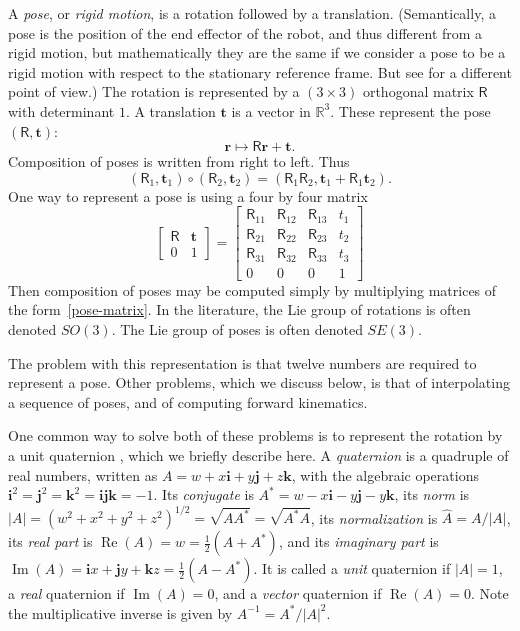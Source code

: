 \documentclass[reqno,12pt]{amsart}
\newcommand\bi{\bm i}
\newcommand\bj{\bm j}
\newcommand\bk{\bm k}
\DeclareMathOperator\realpart{Re}
\DeclareMathOperator\imagpart{Im}
\begin{document}
A \emph{pose}, or \emph{rigid motion}, is a rotation followed by a translation.  (Semantically, a pose is the position of the end effector of the robot, and thus different from a rigid motion, but mathematically they are the same if we consider a pose to be a rigid motion with respect to the stationary reference frame.  But see \cite{chirikjian-et-al} for a different point of view.)  The rotation is represented by a $(3 \times 3)$ orthogonal matrix $\mathsf R$ with determinant $1$.  A translation $\bm t$ is a vector in $\mathbb R^3$.  These represent the pose $(\mathsf R, \bm t)$:
\begin{equation}
\label{pose action}
\bm r \mapsto \mathsf R \bm r + \bm t .
\end{equation}
Composition of poses is written from right to left.  Thus
\begin{equation}
(\mathsf R_1, \bm t_1) \circ (\mathsf R_2, \bm t_2) = (\mathsf R_1 \mathsf R_2, \bm t_1 + \mathsf R_1 \bm t_2).
\end{equation}
One way to represent a pose is using a four by four matrix
\begin{equation}
\label{pose-matrix}
\begin{bmatrix} \mathsf R & \bm t \\ 0 & 1 \end{bmatrix}
 = \begin{bmatrix} \mathsf R_{11} & \mathsf R_{12} & \mathsf R_{13} & t_1 \\
                   \mathsf R_{21} & \mathsf R_{22} & \mathsf R_{23} & t_2 \\
                   \mathsf R_{31} & \mathsf R_{32} & \mathsf R_{33} & t_3 \\
                   0 & 0 & 0 & 1 \end{bmatrix} 
\end{equation}
Then composition of poses may be computed simply by multiplying matrices of the form~\eqref{pose-matrix}.  In the literature, the Lie group of rotations is often denoted $SO(3)$.  The Lie group of poses is often denoted $SE(3)$.

The problem with this representation is that twelve numbers are required to represent a pose.  Other problems, which we discuss below, is that of interpolating a sequence of poses, and of computing forward kinematics.

One common way to solve both of these problems is to represent the rotation by a unit quaternion \cite{quaternions1,quaternions2}, which we briefly describe here.  A \emph{quaternion} is a quadruple of real numbers, written as $A = w + x \bi + y \bj + z \bk$, with the algebraic operations $\bi^2 = \bj^2 = \bk^2 = \bi \bj \bk = -1$.  Its \emph{conjugate} is $A^* = w - x \bi - y \bj - y \bk$, its \emph{norm} is $|A| = (w^2+x^2+y^2+z^2)^{1/2} = \sqrt{A A^*} = \sqrt{A^* A}$, its \emph{normalization} is $\widehat A = A/|A|$, its \emph{real part} is $\realpart(A) = w = \tfrac12(A + A^*)$, and its \emph{imaginary part} is $\imagpart(A) = \bi x + \bj y + \bk z = \tfrac12(A - A^*)$.  It is called a \emph{unit} quaternion if $|A| = 1$, a \emph{real} quaternion if $\imagpart(A) = 0$, and a \emph{vector} quaternion if $\realpart(A) = 0$.  Note the multiplicative inverse is given by $A^{-1} = A^*/|A|^2$.
\end{document}
